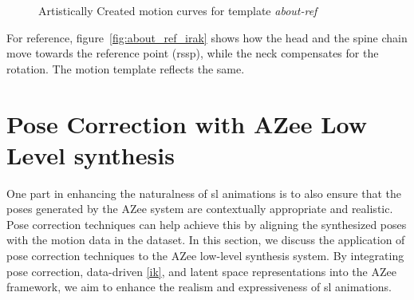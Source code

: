 \documentclass[../../main.tex]{subfiles}
\begin{document}
\begin{figure}
     \centering
    \caption{Artistically Created motion curves for template \emph{about-ref}}
    \label{fig:motion_curves_template_artist}
\end{figure}

For reference, figure~\ref{fig:about_ref_irak} shows how the head and the spine chain move towards the reference point (\gls{rssp}), while the neck compensates for the rotation. The motion template reflects the same. 

\section{Pose Correction with AZee Low Level synthesis}
\label{ch:pose_correction:pose_correction_with_azee}

One part in enhancing the naturalness of \gls{sl} animations is to also ensure that the poses generated by the AZee system are contextually appropriate and realistic. Pose correction techniques can help achieve this by aligning the synthesized poses with the motion data in the dataset. In this section, we discuss the application of pose correction techniques to the AZee low-level synthesis system. By integrating pose correction, data-driven \ref{ik}, and latent space representations into the AZee framework, we aim to enhance the realism and expressiveness of \gls{sl} animations.
\end{document}
